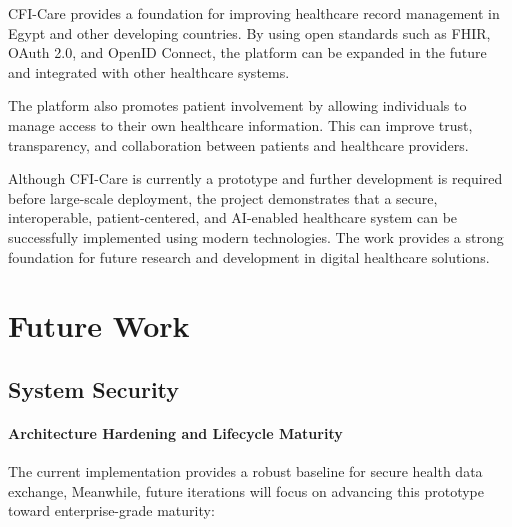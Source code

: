 CFI-Care provides a foundation for improving healthcare record management in Egypt and other developing countries. By using open standards such as FHIR, OAuth 2.0, and OpenID Connect, the platform can be expanded in the future and integrated with other healthcare systems.

The platform also promotes patient involvement by allowing individuals to manage access to their own healthcare information. This can improve trust, transparency, and collaboration between patients and healthcare providers.

Although CFI-Care is currently a prototype and further development is required before large-scale deployment, the project demonstrates that a secure, interoperable, patient-centered, and AI-enabled healthcare system can be successfully implemented using modern technologies. 
The work provides a strong foundation for future research and development in digital healthcare solutions.


\section{Future Work}

\subsection{System Security}

\paragraph{Architecture Hardening and Lifecycle Maturity}
The current implementation provides a robust baseline for secure health data exchange, Meanwhile, 
future iterations will focus on advancing this prototype toward enterprise-grade maturity:

